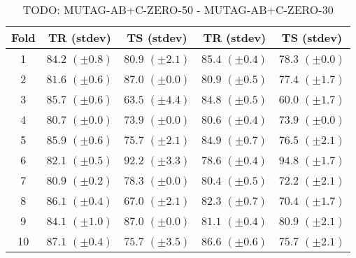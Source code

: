\documentclass[10pt,a4paper]{book}
\begin{document}
\begin{table}[tbph]
\caption{TODO: MUTAG-AB+C-ZERO-50 - MUTAG-AB+C-ZERO-30}
\label{TODO}
\centering
\begin{tabular}{c*{4}{c}}
\toprule
Fold & TR (stdev) & TS (stdev) & TR (stdev) & TS (stdev)\\
\midrule
1 & $84.2$ $(\pm 0.8)$ & $80.9$ $(\pm 2.1)$ & $85.4$ $(\pm 0.4)$ & $78.3$ $(\pm 0.0)$\\
2 & $81.6$ $(\pm 0.6)$ & $87.0$ $(\pm 0.0)$ & $80.9$ $(\pm 0.5)$ & $77.4$ $(\pm 1.7)$\\
3 & $85.7$ $(\pm 0.6)$ & $63.5$ $(\pm 4.4)$ & $84.8$ $(\pm 0.5)$ & $60.0$ $(\pm 1.7)$\\
4 & $80.7$ $(\pm 0.0)$ & $73.9$ $(\pm 0.0)$ & $80.6$ $(\pm 0.4)$ & $73.9$ $(\pm 0.0)$\\
5 & $85.9$ $(\pm 0.6)$ & $75.7$ $(\pm 2.1)$ & $84.9$ $(\pm 0.7)$ & $76.5$ $(\pm 2.1)$\\
6 & $82.1$ $(\pm 0.5)$ & $92.2$ $(\pm 3.3)$ & $78.6$ $(\pm 0.4)$ & $94.8$ $(\pm 1.7)$\\
7 & $80.9$ $(\pm 0.2)$ & $78.3$ $(\pm 0.0)$ & $80.4$ $(\pm 0.5)$ & $72.2$ $(\pm 2.1)$\\
8 & $86.1$ $(\pm 0.4)$ & $67.0$ $(\pm 2.1)$ & $82.3$ $(\pm 0.7)$ & $70.4$ $(\pm 1.7)$\\
9 & $84.1$ $(\pm 1.0)$ & $87.0$ $(\pm 0.0)$ & $81.1$ $(\pm 0.4)$ & $80.9$ $(\pm 2.1)$\\
10 & $87.1$ $(\pm 0.4)$ & $75.7$ $(\pm 3.5)$ & $86.6$ $(\pm 0.6)$ & $75.7$ $(\pm 2.1)$\\
\bottomrule
\end{tabular}
\end{table}




\end{document}
